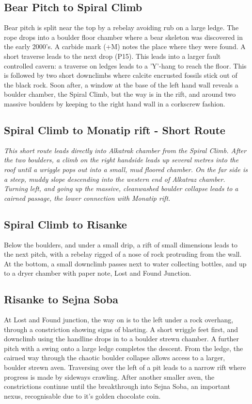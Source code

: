 \subsection{Bear Pitch to Spiral Climb}
Bear pitch is split near the top by a rebelay avoiding rub on a large ledge. The rope drops into a boulder floor chamber where a bear skeleton was discovered in the early 2000's. A carbide mark (+M) notes the place where they were found. A short traverse leads to the next drop (P15). This leads into a larger fault controlled cavern: a traverse on ledges leads to a 'Y'-hang to reach the floor. This is followed by two short downclimbs where calcite encrusted fossils stick out of the black rock. Soon after, a window at the base of the left hand wall reveals a boulder chamber, the Spiral Climb, but the way is in the rift, and around two massive boulders by keeping to the right hand wall in a corkscrew fashion. 

\subsection{Spiral Climb to Monatip rift - Short Route}
\textit{This short route leads directly into Alkatrak chamber from the Spiral Climb. After the two boulders, a climb on the right handside leads up several metres into the roof until a wriggle pops out into a small, mud floored chamber. On the far side is a steep, muddy slope descending into the western end of Alkatraz chamber. Turning left, and going up the massive, cleanwashed boulder collapse leads to a cairned passage, the lower connection with Monatip rift.} 

\subsection{Spiral Climb to Risanke}
Below the boulders, and under a small drip, a rift of small dimensions leads to the next pitch, with a rebelay rigged of a nose of rock protruding from the wall. At the bottom, a small downclimb passes next to water collecting bottles, and up to a dryer chamber with paper note, Lost and Found Junction.

\subsection{Risanke to Sejna Soba}
At Lost and Found junction, the way on is to the left under a rock overhang, through a constriction showing signs of blasting. A short wriggle feet first, and downclimb using the handline drops in to a boulder strewn chamber. A further pitch with a swing onto a large ledge completes the descent. From the ledge, the cairned way through the chaotic boulder collapse allows access to a larger, boulder strewn aven. Traversing over the left  of a pit leads to a narrow rift where progress is made by sideways crawling. After another smaller aven, the constrictions continue until the breakthrough into Sejna Soba, an important nexus, recognisable due to it’s golden chocolate coin.

